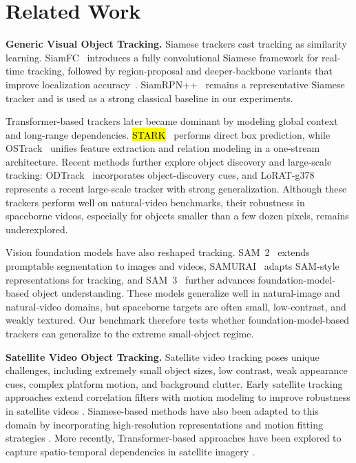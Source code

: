\documentclass{article}
\begin{document}
\section{Related Work}

\noindent\textbf{Generic Visual Object Tracking.} Siamese trackers cast tracking as similarity learning. SiamFC~\citep{bertinetto2016siamfc} introduces a fully convolutional Siamese framework for real-time tracking, followed by region-proposal and deeper-backbone variants that improve localization accuracy~\citep{li2018siamrpn,li2019siamrpn++}. SiamRPN++~\citep{li2019siamrpn++} remains a representative Siamese tracker and is used as a strong classical baseline in our experiments.

Transformer-based trackers later became dominant by modeling global context and long-range dependencies. \hl{STARK}~\citep{yan2021stark} performs direct box prediction, while OSTrack~\citep{ye2022joint} unifies feature extraction and relation modeling in a one-stream architecture. Recent methods further explore object discovery and large-scale tracking: ODTrack~\citep{zheng2024odtrack} incorporates object-discovery cues, and LoRAT-g378~\citep{lin2024tracking} represents a recent large-scale tracker with strong generalization. Although these trackers perform well on natural-video benchmarks, their robustness in spaceborne videos, especially for objects smaller than a few dozen pixels, remains underexplored.

Vision foundation models have also reshaped tracking. SAM~2~\citep{ravi2024sam} extends promptable segmentation to images and videos, SAMURAI~\citep{yang2026samurai} adapts SAM-style representations for tracking, and SAM~3~\citep{carion2026sam3} further advances foundation-model-based object understanding. These models generalize well in natural-image and natural-video domains, but spaceborne targets are often small, low-contrast, and weakly textured. Our benchmark therefore tests whether foundation-model-based trackers can generalize to the extreme small-object regime.

\noindent\textbf{Satellite Video Object Tracking.} Satellite video tracking
poses unique challenges, including extremely small object sizes, %
low contrast, weak appearance cues, complex platform motion, and
background clutter. Early satellite tracking approaches extend correlation
filters with motion modeling to improve robustness in satellite videos
\citep{lin2024motion}. Siamese-based methods have also been adapted to this
domain by incorporating high-resolution representations and motion fitting
strategies \citep{ruan2022deep, shao2021hrsiam}. More recently,
Transformer-based approaches have been explored to capture spatio-temporal
dependencies in satellite imagery \citep{lai2023target}.
\end{document}
